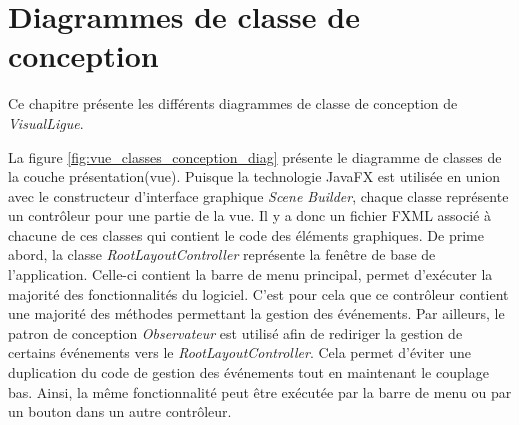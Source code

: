 
\chapter{Diagrammes de classe de conception}
\label{s:classe_conception}

Ce chapitre présente les différents diagrammes de classe de conception de \textit{VisualLigue}.

La figure \ref{fig:vue_classes_conception_diag} présente le diagramme de classes de la couche présentation(vue).
Puisque la technologie JavaFX est utilisée en union avec le constructeur d'interface graphique \textit{Scene Builder}, chaque classe représente un contrôleur pour une partie de la vue.
Il y a donc un fichier FXML associé à chacune de ces classes qui contient le code des éléments graphiques.
De prime abord, la classe \textit{RootLayoutController} représente la fenêtre de base de l'application.
Celle-ci contient la barre de menu principal, permet d'exécuter la majorité des fonctionnalités du logiciel.
C'est pour cela que ce contrôleur contient une majorité des méthodes permettant la gestion des événements.
Par ailleurs, le patron de conception \textit{Observateur} est utilisé afin de rediriger la gestion de certains événements vers le \textit{RootLayoutController}.
Cela permet d'éviter une duplication du code de gestion des événements tout en maintenant le couplage bas.
Ainsi, la même fonctionnalité peut être exécutée par la barre de menu ou par un bouton dans un autre contrôleur.


